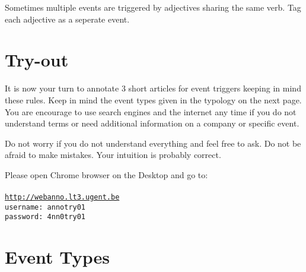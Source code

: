 \documentclass[a4paper]{report}
\begin{document}
\begin{exe}
    \ex {}
    \ex {}
\end{exe}

Sometimes multiple events are triggered by adjectives sharing the same verb. Tag each adjective as a seperate event.

\section{Try-out}

It is now your turn to annotate 3 short articles for event triggers keeping in mind these rules.
Keep in mind the event types given in the typology on the next page.
You are encourage to use search engines and the internet any time if you do not understand terms or need additional information on a company or specific event.

Do not worry if you do not understand everything and feel free to ask.
Do not be afraid to make mistakes.
Your intuition is probably correct.

Please open Chrome browser on the Desktop and go to: \\\\
\large{\texttt{\url{http://webanno.lt3.ugent.be}}} \\
\large{\texttt{username: annotry01}} \\
\large{\texttt{password: 4nn0try01}}

\newpage
\section{Event Types}
\end{document}
